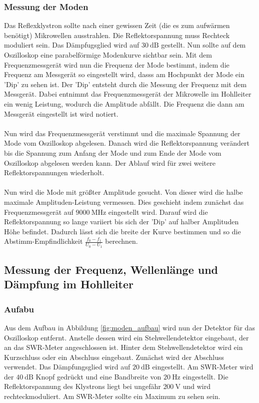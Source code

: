 \subsubsection{Messung der Moden}
\label{sec:moden_durchfuehrung}
Das Reflexklystron sollte nach einer gewissen Zeit (die es zum aufwärmen benötigt) Mikrowellen ausstrahlen.
Die Reflektorspannung muss Rechteck moduliert sein.
Das Dämpfugsglied wird auf $\SI{30}{\dB}$ gestellt.
Nun sollte auf dem Oszilloskop eine parabelförmige Modenkurve sichtbar sein.
Mit dem Frequenzmessgerät wird nun die Frequenz der Mode bestimmt, indem die Frequenz am Messgerät so eingestellt wird, dasss am Hochpunkt der Mode ein 'Dip' zu sehen ist.
Der 'Dip' entsteht durch die Messung der Frequenz mit dem Messgerät.
Dabei entnimmt das Frequenzmessgerät der Mikrowelle im Hohlleiter ein wenig Leistung, wodurch die Amplitude abfällt.
Die Frequenz die dann am Messgerät eingestellt ist wird notiert.
\\\\
Nun wird das Frequenzmessgerät verstimmt und die maximale Spannung der Mode vom Oszilloskop abgelesen.
Danach wird die Reflektorspannung verändert bis die Spannung zum Anfang der Mode und zum Ende der Mode vom Oszilloskop abgelesen werden kann.
Der Ablauf wird für zwei weitere Reflektorspannungen wiederholt.
\\\\
Nun wird die Mode mit größter Amplitude gesucht.
Von dieser wird die halbe maximale Amplituden-Leistung vermessen.
Dies geschieht indem zunächst das Frequenzmessgerät auf $\SI{9000}{\mega\Hz}$ eingestellt wird.
Darauf wird die Reflektorspannung so lange variiert bis sich der 'Dip' auf halber Amplituden Höhe befindet.
Dadurch lässt sich die breite der Kurve bestimmen und so die Abstimm-Empfindlichkeit $\frac{f_0 - f_1}{U_0 - U_1}$ berechnen.

\subsection{Messung der Frequenz, Wellenlänge und Dämpfung im Hohlleiter}
\subsubsection{Aufabu}
\label{sec:aufbau}
Aus dem Aufbau in Abbildung \ref{fig:moden_aufbau} wird nun der Detektor für das Oszilloskop entfernt.
Anstelle dessen wird ein Stehwellendetektor eingebaut, der an das SWR-Meter angeschlossen ist.
Hinter dem Stehwellendetektor wird ein Kurzschluss oder ein Abschluss eingebaut.
Zunächst wird der Abschluss verwendet.
Das Dämpfungsglied wird auf $\SI{20}{\dB}$ eingestellt.
Am SWR-Meter wird der $\SI{40}{\dB}$ Knopf gedrückt und eine Bandbreite von $\SI{20}{\Hz}$ eingestellt.
Die Reflektorspannung des Klystrons liegt bei ungefähr $\SI{200}{\V}$ und wird rechteckmoduliert.
Am SWR-Meter sollte ein Maximum zu sehen sein.


